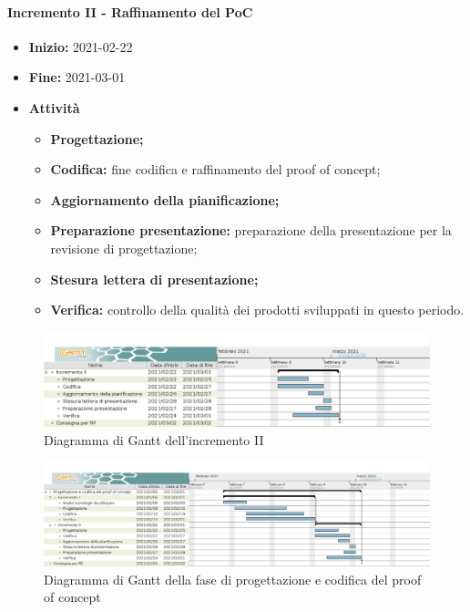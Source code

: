 \paragraph[Incremento II]{Incremento II - \textnormal{Raffinamento del PoC}}
\begin{itemize}
    \item [] \textbf{Inizio:} 2021-02-22
    \item [] \textbf{Fine:} 2021-03-01
    \item [] \textbf{Attività}
          \begin{itemize}
              \item \textbf{Progettazione;}
              \item \textbf{Codifica:} fine codifica e raffinamento del proof of concept;
              \item \textbf{Aggiornamento della pianificazione;}
              \item \textbf{Preparazione presentazione:} preparazione della presentazione per la revisione di progettazione;
              \item \textbf{Stesura lettera di presentazione;}
              \item \textbf{Verifica:} controllo della qualità dei prodotti sviluppati in questo periodo.
          \end{itemize}
\end{itemize}

\begin{figure}[H]
    \centering
    \includegraphics[width=1\linewidth]{res/images/pianificazione/incremento_2.png}
    \caption{Diagramma di Gantt dell'incremento II}
    \label{fig:_Gantt incremento II}
\end{figure}

\begin{figure}[H]
    \centering
    \includegraphics[width=1\linewidth]{res/images/pianificazione/progettazione_e_codifica_del_proof_of_concept.png}
    \caption{Diagramma di Gantt della fase di progettazione e codifica del proof of concept}
    \label{fig:_Gantt progettazione e codifica del proof of concept}
\end{figure}

